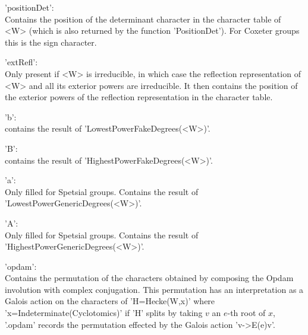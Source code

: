'positionDet':\\  Contains the position of the determinant character in the
   character  table  of  <W>  (which  is  also  returned  by  the  function
   'PositionDet'). For Coxeter groups this is the sign character.

'extRefl':\\  Only  present  if  <W>  is  irreducible,  in  which  case the
     reflection  representation  of  <W>  and  all  its exterior powers are
     irreducible.  It then contains the position  of the exterior powers of
     the reflection representation in the character table.

'b':\\ contains  the    result   of    'LowestPowerFakeDegrees(<W>)'.

'B':\\ contains  the    result   of    'HighestPowerFakeDegrees(<W>)'.

'a':\\ Only filled for Spetsial groups. Contains the result of
   'LowestPowerGenericDegrees(<W>)'.

'A':\\ Only filled for Spetsial groups. Contains the result of
   'HighestPowerGenericDegrees(<W>)'.

'opdam':\\ Contains the permutation of the characters obtained by composing
   the  Opdam involution with complex  conjugation. This permutation has an
   interpretation  as a Galois action on the characters of 'H\:=Hecke(W,x)'
   where  'x\:=Indeterminate(Cyclotomics)'\: if 'H' splits by taking $v$ an
   $e$-th  root of  $x$, '.opdam'  records the  permutation effected by the
   Galois action 'v->E(e)\*v'.


